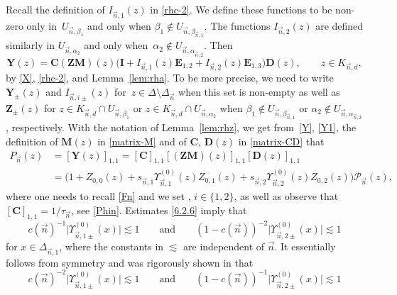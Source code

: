 \documentclass[pdftex]{sigma}
\numberwithin{equation}{section}
\newcommand{\n}{{\vec n}}
\begin{document}
Recall the definition of $ I_{\n,1}(z) $ in \eqref{rhc-2}. We define these functions to be non-zero only in~$ U_{\n,\beta_1} $ and only when $ \beta_1\not\in U_{\n,\beta_{\n,1}} $. The functions $ I_{\n,2}(z) $ are defined similarly in $ U_{\n,\alpha_2 } $ and only when~$ \alpha_2\not\in U_{\n,\alpha_{\n,2}} $. Then
\begin{equation}
\label{Y1}
\boldsymbol Y(z) = \boldsymbol C (\boldsymbol{ZM})(z)\bigl(\boldsymbol I+ I_{\n,1}(z)\boldsymbol E_{1,2}+ I_{\n,2}(z)\boldsymbol E_{1,3}\bigr)\boldsymbol D(z), \qquad z\in K_{\n,d},
\end{equation}
by \eqref{X}, \eqref{rhc-2}, and Lemma~\ref{lem:rha}. To be more precise, we need to write $ \boldsymbol Y_\pm(z) $ and $ I_{\n,i\pm}(z) $ for~${ z\in \Delta \setminus \Delta_\n }$ when this set is non-empty as well as $ \boldsymbol Z_\pm(z) $ for $ z\in K_{\n,d}\cap U_{\n,\beta_1} $ or $ z\in K_{\n,d}\cap U_{\n,\alpha_2} $ when $ \beta_1\notin U_{\n,\beta_{\n,1}} $ or $ \alpha_2\notin U_{\n,\alpha_{\n,2}} $, respectively. With the notation of Lemma~\ref{lem:rhz}, we get from~\eqref{Y}, \eqref{Y1}, the definition of $ \boldsymbol M(z) $ in \eqref{matrix-M} and of $ \boldsymbol C $, $ \boldsymbol D(z) $ in \eqref{matrix-CD} that
\begin{align}
P_\n(z) &= [\boldsymbol Y(z)]_{1,1} = [\boldsymbol C]_{1,1} [(\boldsymbol{ZM})(z)]_{1,1}[\boldsymbol D(z)]_{1,1} \nonumber \\
& = \bigl( 1 + Z_{0,0}(z) + s_{\n,1}\Upsilon_{\n,1}^{(0)}(z)Z_{0,1}(z) + s_{\n,2}\Upsilon_{\n,2}^{(0)}(z)Z_{0,2}(z) \bigr) \mathcal P_\n(z),
\label{Pn}
\end{align}
where one needs to recall \eqref{Fn} and we set \smash{$ s_{\n,i}:=S_\n^{(0)}(\infty)/S_\n^{(i)}(\infty) $}, $ i\in\{1,2\} $, as well as observe that $ [\boldsymbol C]_{1,1} = 1/\tau_\n $, see \eqref{Phin}. Estimates \eqref{6.2.6} imply that
\begin{equation}
\label{Up-bounds1}
c(\n)^{-1}\big|\Upsilon_{\n,1\pm}^{(0)}(x)\big| \lesssim 1 \qquad \text{and}\qquad  (1-c(\n))^{-2}\big|\Upsilon_{\n,2\pm}^{(0)}(x)\big| \lesssim 1
\end{equation}
for $ x\in \Delta_{\n,1} $, where the constants in $ \lesssim $ are independent of $ \n $. It essentially follows from symmetry and was rigorously shown in \cite[Lemma~5.2]{ApDenYa21} that
\begin{equation}
\label{Up-bounds2}
c(\n)^{-2}\big|\Upsilon_{\n,1\pm}^{(0)}(x)\big| \lesssim 1 \qquad \text{and}\qquad  (1-c(\n))^{-1}\big|\Upsilon_{\n,2\pm}^{(0)}(x)\big| \lesssim 1
\end{equation}
\end{document}
